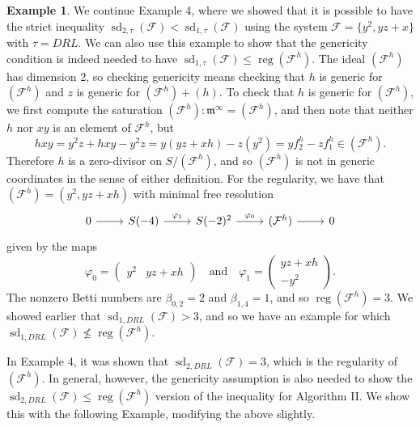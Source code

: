 \documentclass[11pt]{article}
\newcommand{\F}{\mathcal{F}}
\DeclareMathOperator{\sd}{sd}
\DeclareMathOperator{\reg}{reg}
\theoremstyle{definition}
\newtheorem{example}{Example}
\begin{document}
\begin{example}
	We continue Example 4, where we showed that it is possible to have the strict inequality $\sd_{2,\tau}(\F) < \sd_{1, \tau}(\F)$ using the system $\F = \{y^2, yz + x\}$ with $\tau = DRL$. We can also use this example to show that the genericity condition is indeed needed to have $\sd_{1, \tau}(\F) \leq \reg(\F^h)$. The ideal $(\F^h)$ has dimension 2, so checking genericity means checking that $h$ is generic for $(\F^h)$ and $z$ is generic for $(\F^h) + (h)$. To check that $h$ is generic for $(\F^h)$, we first compute the saturation $(\F^h): \mathfrak{m}^\infty = (\F^h)$, and then note that neither $h$ nor $xy$ is an element of $\F^h$, but \[ hxy = y^2z + hxy - y^2z = y(yz + xh) - z(y^2) = yf_2^h - zf_1^h \in (\F^h). \] Therefore $h$ is a zero-divisor on $S/(\F^h)$, and so $(\F^h)$ is not in generic coordinates in the sense of either definition. For the regularity, we have that $(\F^h) = (y^2, yz + xh)$ with minimal free resolution \[ \begin{tikzcd}
		0 \arrow[r] & S(-4) \arrow[r, "\varphi_1"] & S(-2)^2 \arrow[r, "\varphi_0"] & (\F^h) \arrow[r] & 0
	\end{tikzcd} \] given by the maps \[ \varphi_0 = \begin{pmatrix}
		y^2 & yz + xh 
	\end{pmatrix} \quad \text{and} \quad \varphi_1 = \begin{pmatrix}
		yz + xh \\
		-y^2
	\end{pmatrix}. \] The nonzero Betti numbers are $\beta_{0,2} = 2$ and $\beta_{1,4} = 1$, and so $\reg(\F^h) = 3$. We showed earlier that $\sd_{1,DRL}(\F) > 3$, and so we have an example for which $\sd_{1,DRL}(\F) \not \leq \reg(\F^h)$. 
\end{example}


In Example 4, it was shown that $\sd_{2,DRL}(\F) = 3$, which is the regularity of $(\F^h)$. In general, however, the genericity assumption is also needed to show the $\sd_{2,DRL}(\F) \leq \reg(\F^h)$ version of the inequality for Algorithm II. We show this with the following Example, modifying the above slightly.
\end{document}
